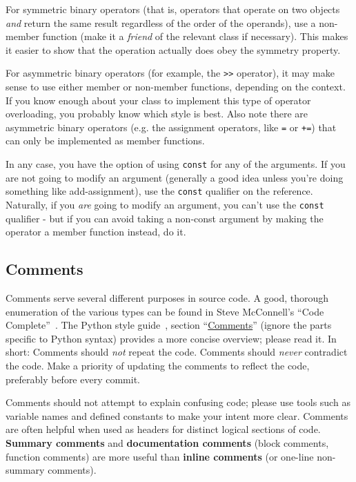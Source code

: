 \documentclass[12pt]{article}
\newcommand{\textdef}[1]{\textbf{#1}}
\begin{document}
For symmetric binary operators (that is, operators that operate on two objects \emph{and} return the same result regardless of the order of the operands), use a non-member function (make it a \emph{friend} of the relevant class if necessary). This makes it easier to show that the operation actually does obey the symmetry property.

For asymmetric binary operators (for example, the \texttt{>>} operator), it may make sense to use either member or non-member functions, depending on the context. If you know enough about your class to implement this type of operator overloading, you probably know which style is best. Also note there are asymmetric binary operators (e.g. the assignment operators, like \texttt{=} or \texttt{+=}) that can only be implemented as member functions.

In any case, you have the option of using \texttt{const} for any of the arguments. If you are not going to modify an argument (generally a good idea unless you're doing something like add-assignment), use the \texttt{const} qualifier on the reference. Naturally, if you \emph{are} going to modify an argument, you can't use the \texttt{const} qualifier - but if you can avoid taking a non-const argument by making the operator a member function instead, do it.

\subsection{Comments}
Comments serve several different purposes in source code. A good, thorough enumeration of the various types can be found in Steve McConnell's ``Code Complete''~\cite{codecomplete}. The Python style guide~\cite{pyguide}, section ``\href{http://www.python.org/dev/peps/pep-0008/#comments}{Comments}'' (ignore the parts specific to Python syntax) provides a more concise overview; please read it. In short: Comments should \emph{not} repeat the code. Comments should \emph{never} contradict the code. Make a priority of updating the comments to reflect the code, preferably before every commit.

Comments should not attempt to explain confusing code; please use tools such as variable names and defined constants to make your intent more clear. Comments are often helpful when used as headers for distinct logical sections of code. \textdef{Summary comments} and \textdef{documentation comments} (block comments, function comments) are more useful than \textdef{inline comments} (or one-line non-summary comments).
\end{document}
